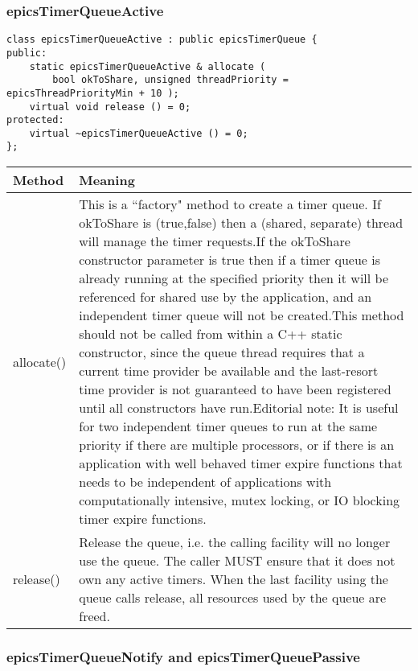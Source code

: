 \subsubsection{epicsTimerQueueActive}

\begin{verbatim}
class epicsTimerQueueActive : public epicsTimerQueue {
public:
    static epicsTimerQueueActive & allocate (
        bool okToShare, unsigned threadPriority = epicsThreadPriorityMin + 10 );
    virtual void release () = 0;
protected:
    virtual ~epicsTimerQueueActive () = 0;
};
\end{verbatim}

\begin{center}
\begin{longtable}{p{1.1in}p{5.0in}}
\textbf{Method} & \textbf{Meaning}\\
\hline
allocate() & This is a ``factory" method to create a timer queue. If okToShare is (true,false) then a (shared, separate) thread will manage the timer requests.If the okToShare constructor parameter is true then if a timer queue is already running at the specified priority then it will be referenced for shared use by the application, and an independent timer queue will not be created.This method should not be called from within a C++ static constructor, since the queue thread requires that a current time provider be available and the last-resort time provider is not guaranteed to have been registered until all constructors have run.Editorial note: It is useful for two independent timer queues to run at the same priority if there are multiple processors, or if there is an application with well behaved timer expire functions that needs to be independent of applications with computationally intensive, mutex locking, or IO blocking timer expire functions. \\
release() & Release the queue, i.e. the calling facility will no longer use the queue. The caller MUST ensure that it does not own any active timers. When the last facility using the queue calls release, all resources used by the queue are freed.
\end{longtable}

\end{center}


\subsubsection{epicsTimerQueueNotify and epicsTimerQueuePassive}

